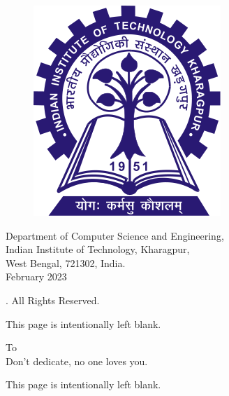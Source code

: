 \documentclass[12pt,a4paper,openright,notitlepage]{extreport}
\begin{document}
\vspace{\fill}
\begin{figure}[h]
	\centering
	\includegraphics[scale=0.2]{icons/iitkgp.png}
\end{figure}

\begin{center}
{
	Department of Computer Science and Engineering, \\
	Indian Institute of Technology, Kharagpur,\\
	West Bengal, 721302, India.\\
	February 2023
}
\end{center}
\vspace{10pt}
\begin{center}
    \textcopyright \myname. All Rights Reserved.
\end{center}
\thispagestyle{empty}
\newpage

\mbox{}
\vspace{\fill}
\begin{center}
    This page is intentionally left blank.
\end{center}
\thispagestyle{empty}
\newpage
\begin{center}
    {\Large To}\\
    \vspace{5pt}
    {\Large Don't dedicate, no one loves you.}
\end{center}

\thispagestyle{empty}
\newpage

\mbox{}
\vspace{\fill}
\begin{center}
    This page is intentionally left blank.
\end{center}
\thispagestyle{empty}
\newpage
\end{document}
